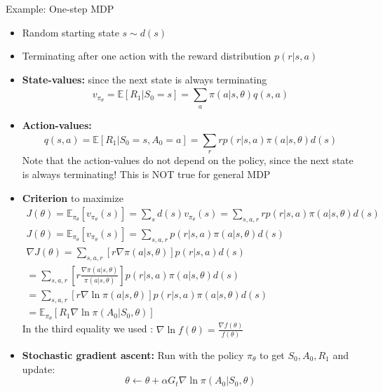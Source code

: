 \begin{example}{Example: One-step MDP}
	\begin{itemize}
		\item Random starting state $s \sim d(s)$
		\item Terminating after one action with the reward distribution $p(r|s,a)$ 
		\item \textbf{State-values:} since the next state is always terminating
			\begin{equation}
				v_{\pi_\theta} = \mathbb{E}[R_1 |S_0 =s] = \sum_{a}^{}\pi (a|s,\theta)q(s,a)
			\end{equation}
		\item \textbf{Action-values:}
			\begin{equation}
				q(s,a) = \mathbb{E}[R_1 |S_0 = s, A_0 = a] = \sum_{r}^{}r p(r|s,a) \pi (a|s,\theta)d(s)
			\end{equation}
			Note that the action-values do not depend on the policy, since the next state is always terminating! This is NOT true for general MDP
		\item \textbf{Criterion} to maximize
			\begin{equation}
			\begin{aligned}
				J(\theta) = \mathbb{E}_{\pi_\theta}[v_{\pi_\theta}(s)] = \sum_{s}^{}d(s)v_{\pi_\theta}(s) = \sum_{s,a,r}^{} r p(r|s,a)\pi (a|s,\theta)d(s) \\ J (\theta) = \mathbb{E}_{\pi_\theta} [v_{\pi_\theta}(s)] = \sum_{s,a,r}^{} p(r|s,a)\pi (a|s,\theta)d(s) \\
				\nabla J(\theta) = \sum_{s,a,r}^{}[r \nabla \pi (a|s, \theta)] p(r|s,a)d(s)\\
				= \sum_{s,a,r}^{} [ r\frac{\nabla \pi (a|s,\theta)} {\pi (a|s,\theta)} ] p(r|s,a) \pi (a|s,\theta)d(s) \\
				= \sum_{s,a,r}^{} [r \nabla \ln \pi (a|s,\theta)]p(r|s,a) \pi (a|s,\theta)d(s) \\
				= \mathbb{E}_{\pi_\theta} [R_1 \nabla \ln \pi (A_0|S_0, \theta)]
			\end{aligned}
			\end{equation}
		In the third equality we used : $\nabla \ln f(\theta) = \frac{\nabla f(\theta)} {f(\theta)} $
		\item \textbf{Stochastic gradient ascent:} Run with the policy $\pi_\theta$ to get $S_0, A_0, R_1$ and update:
			\begin{equation}
				\theta \leftarrow \theta + \alpha G_t \nabla \ln \pi (A_0|S_0, \theta)
			\end{equation}
	\end{itemize}
\end{example}	


